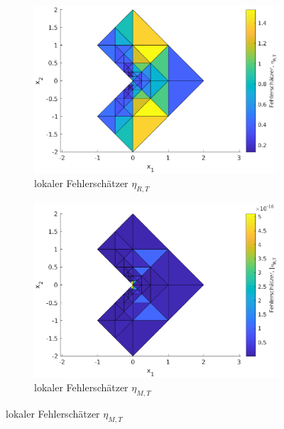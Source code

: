 \documentclass{scrartcl}
\begin{document}
\begin{figure}[h]
\centering
\begin{subfigure}[b]{0.45\textwidth}
\centering
\includegraphics[width=\textwidth]{Plots/LShapeBenchmarkLocaletaR94}
\caption{lokaler Fehlerschätzer $\eta_{R,T}$}
\label{pl:LShapeLocalEtaR}
\end{subfigure}
\hfill
\begin{subfigure}[b]{0.45\textwidth}
\centering
\includegraphics[width=\textwidth]{Plots/LShapeBenchmarkLocaletaM94}
\caption{lokaler Fehlerschätzer $\eta_{M,T}$}
\label{pl:LShapeLocalEtaM}
\end{subfigure}


\end{figure}
\end{document}
